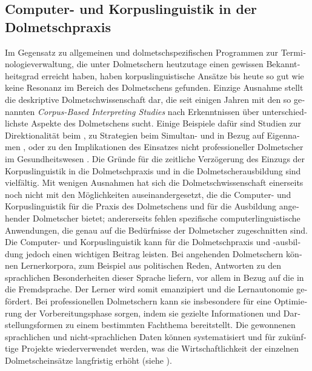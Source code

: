 \documentclass[output=paper]{LSP/langsci}
\begin{document}
\begin{otherlanguage}{ngerman}
\section{Computer- und Korpuslinguistik in der Dolmetschpraxis}\label{sec:fantinuoli:5}

Im Gegensatz zu allgemeinen und dolmetschspezifischen Programmen zur Terminologieverwaltung, die unter Dolmetschern heutzutage einen gewissen Bekanntheitsgrad erreicht haben, haben korpuslinguistische Ansätze bis heute so gut wie keine Resonanz im Bereich des Dolmetschens gefunden. Einzige Ausnahme stellt die deskriptive Dolmetschwissenschaft dar, die seit einigen Jahren mit den so genannten \textit{Corpus-Based Interpreting Studies} nach Erkenntnissen über unterschiedlichste Aspekte des Dolmetschens sucht. Einige Beispiele dafür sind Studien zur Direktionalität beim  \citep{Bendazzoli2005}, zu Strategien beim Simultan- und  in Bezug auf Eigennamen \citep{Meyer2008}, oder zu den Implikationen des Einsatzes nicht professioneller Dolmetscher im Gesundheitswesen \citep{MeyerEtAl2010}. Die Gründe für die zeitliche Verzögerung des Einzugs der Korpuslinguistik in die Dolmetschpraxis und in die Dolmetscherausbildung sind vielfältig. Mit wenigen Ausnahmen 
\citep{Fantinuoli2006,Gorjanc2009} hat sich die Dolmetschwissenschaft einerseits noch nicht mit den Möglichkeiten auseinandergesetzt, die die Computer- und Korpuslinguistik für die Praxis des Dolmetschens und für die Ausbildung angehender Dolmetscher bietet; andererseits fehlen spezifische computerlinguistische Anwendungen, die genau auf die Bedürfnisse der Dolmetscher zugeschnitten sind. Die Computer- und Korpuslinguistik kann für die Dolmetschpraxis und -ausbildung jedoch einen wichtigen Beitrag leisten. Bei angehenden Dolmetschern können Lernerkorpora, zum Beispiel aus politischen Reden, Antworten zu den sprachlichen Besonderheiten dieser Sprache liefern, vor allem in Bezug auf die  in die Fremdsprache. Der Lerner wird somit emanzipiert und die Lernautonomie gefördert. Bei professionellen Dolmetschern kann sie insbesondere für eine Optimierung der Vorbereitungsphase sorgen, indem sie gezielte Informationen und Darstellungsformen zu einem bestimmten Fachthema bereitstellt. Die gewonnenen sprachlichen und nicht-sprachlichen Daten können systematisiert und für zukünftige Projekte wiederverwendet werden, was die Wirtschaftlichkeit der einzelnen Dolmetscheinsätze langfristig erhöht (siehe ). 


\end{otherlanguage}
\end{document}
